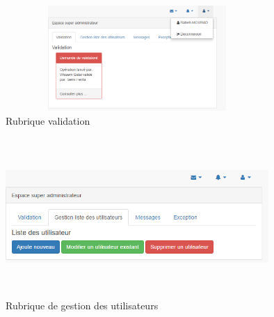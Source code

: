 \begin{figure}[!h]
\begin{center}
\includegraphics[width=10cm,height=4cm]{resultats/capture_validation.png}
\end{center}
\caption{Rubrique validation}
\end{figure}

\begin{figure}[!h]
\begin{center}
\includegraphics[width=10cm,height=6cm]{resultats/gestion.png}
\end{center}
\caption{Rubrique de gestion des utilisateurs}
\end{figure}

